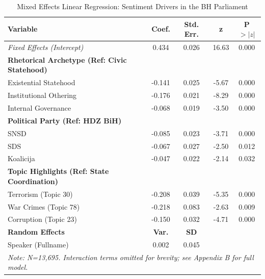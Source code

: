 \begin{table}[htbp]
\centering
\caption{Mixed Effects Linear Regression: Sentiment Drivers in the BH Parliament}
\label{tab:regression_main}
\small
\begin{tabular}{lcccc}
\toprule
\textbf{Variable} & \textbf{Coef.} & \textbf{Std. Err.} & \textbf{z} & \textbf{P$>|z|$} \\
\midrule
\textit{Fixed Effects (Intercept)} & 0.434 & 0.026 & 16.63 & 0.000 \\
\textbf{Rhetorical Archetype (Ref: Civic Statehood)} \\
Existential Statehood & -0.141 & 0.025 & -5.67 & 0.000 \\
Institutional Othering & -0.176 & 0.021 & -8.29 & 0.000 \\
Internal Governance & -0.068 & 0.019 & -3.50 & 0.000 \\
\textbf{Political Party (Ref: HDZ BiH)} \\
SNSD & -0.085 & 0.023 & -3.71 & 0.000 \\
SDS & -0.067 & 0.027 & -2.50 & 0.012 \\
Koalicija & -0.047 & 0.022 & -2.14 & 0.032 \\
\textbf{Topic Highlights (Ref: State Coordination)} \\
Terrorism (Topic 30) & -0.208 & 0.039 & -5.35 & 0.000 \\
War Crimes (Topic 78) & -0.218 & 0.083 & -2.63 & 0.009 \\
Corruption (Topic 23) & -0.150 & 0.032 & -4.71 & 0.000 \\
\midrule
\textbf{Random Effects} & \textbf{Var.} & \textbf{SD} & & \\
Speaker (Fullname) & 0.002 & 0.045 & & \\
\bottomrule
\multicolumn{5}{l}{\textit{Note: N=13,695. Interaction terms omitted for brevity; see Appendix B for full model.}} \\
\end{tabular}
\end{table}


